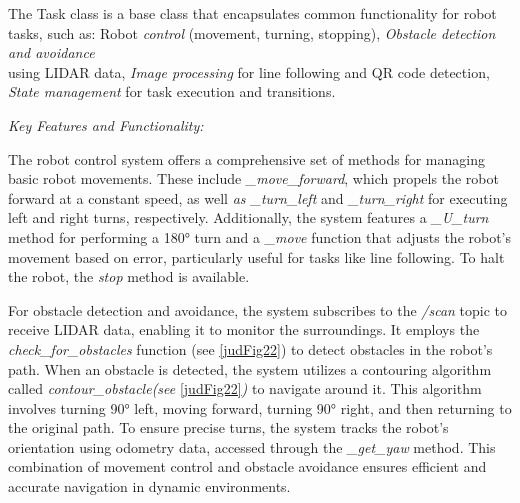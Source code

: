 \documentclass[a4paper,12pt]{extreport}
\begin{document}
The Task class is a base class that encapsulates common functionality
for robot tasks, such as: Robot \emph{control} (movement, turning,
stopping), \emph{Obstacle detection and avoidance} \\using LIDAR data,
\emph{Image processing} for line following and QR code detection,
\emph{State management} for task execution and transitions.

\emph{Key Features and Functionality:}

The robot control system offers a comprehensive set of methods for
managing basic robot movements. These include \emph{\_move\_forward},
which propels the robot forward at a constant speed, as well \emph{as
\_turn\_left} and \emph{\_turn\_right} for executing left and right
turns, respectively. Additionally, the system features a
\emph{\_U\_turn} method for performing a 180° turn and a \emph{\_move}
function that adjusts the robot's movement based on error, particularly
useful for tasks like line following. To halt the robot, the \emph{stop}
method is available.

For obstacle detection and avoidance, the system subscribes to the
\emph{/scan} topic to receive LIDAR data, enabling it to monitor the
surroundings. It employs the \emph{check\_for\_obstacles} function (see
\cref{judFig22}) to detect obstacles in the robot's path. When an obstacle is
detected, the system utilizes a contouring algorithm called
\emph{contour\_obstacle(see} \cref{judFig22}\emph{)} to navigate around it.
This algorithm involves turning 90° left, moving forward, turning 90°
right, and then returning to the original path. To ensure precise turns,
the system tracks the robot's orientation using odometry data, accessed
through the \emph{\_get\_yaw} method. This combination of movement
control and obstacle avoidance ensures efficient and accurate navigation
in dynamic environments.
\end{document}
